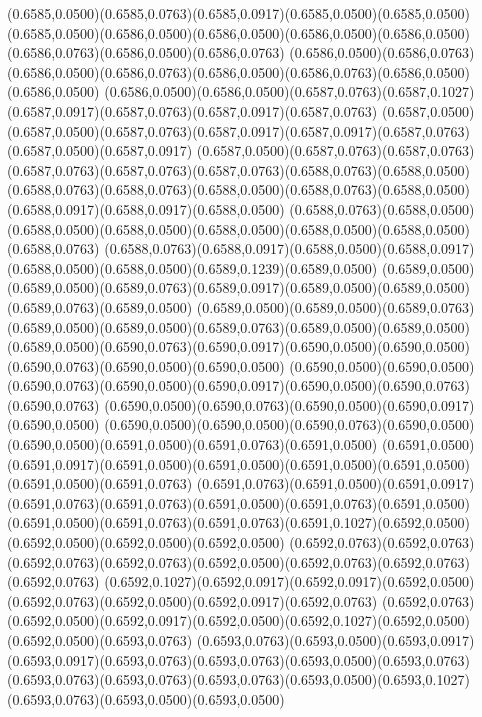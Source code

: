 (0.6585,0.0500)(0.6585,0.0763)(0.6585,0.0917)(0.6585,0.0500)(0.6585,0.0500)
\PST@Solid(0.6585,0.0500)(0.6586,0.0500)(0.6586,0.0500)(0.6586,0.0500)(0.6586,0.0500)(0.6586,0.0763)(0.6586,0.0500)(0.6586,0.0763)
(0.6586,0.0500)(0.6586,0.0763)(0.6586,0.0500)(0.6586,0.0763)(0.6586,0.0500)(0.6586,0.0763)(0.6586,0.0500)(0.6586,0.0500)
(0.6586,0.0500)(0.6586,0.0500)(0.6587,0.0763)(0.6587,0.1027)(0.6587,0.0917)(0.6587,0.0763)(0.6587,0.0917)(0.6587,0.0763)
(0.6587,0.0500)(0.6587,0.0500)(0.6587,0.0763)(0.6587,0.0917)(0.6587,0.0917)(0.6587,0.0763)(0.6587,0.0500)(0.6587,0.0917)
(0.6587,0.0500)(0.6587,0.0763)(0.6587,0.0763)(0.6587,0.0763)(0.6587,0.0763)(0.6587,0.0763)(0.6588,0.0763)(0.6588,0.0500)
(0.6588,0.0763)(0.6588,0.0763)(0.6588,0.0500)(0.6588,0.0763)(0.6588,0.0500)(0.6588,0.0917)(0.6588,0.0917)(0.6588,0.0500)
(0.6588,0.0763)(0.6588,0.0500)(0.6588,0.0500)(0.6588,0.0500)(0.6588,0.0500)(0.6588,0.0500)(0.6588,0.0500)(0.6588,0.0763)
(0.6588,0.0763)(0.6588,0.0917)(0.6588,0.0500)(0.6588,0.0917)(0.6588,0.0500)(0.6588,0.0500)(0.6589,0.1239)(0.6589,0.0500)
(0.6589,0.0500)(0.6589,0.0500)(0.6589,0.0763)(0.6589,0.0917)(0.6589,0.0500)(0.6589,0.0500)(0.6589,0.0763)(0.6589,0.0500)
(0.6589,0.0500)(0.6589,0.0500)(0.6589,0.0763)(0.6589,0.0500)(0.6589,0.0500)(0.6589,0.0763)(0.6589,0.0500)(0.6589,0.0500)
(0.6589,0.0500)(0.6590,0.0763)(0.6590,0.0917)(0.6590,0.0500)(0.6590,0.0500)(0.6590,0.0763)(0.6590,0.0500)(0.6590,0.0500)
(0.6590,0.0500)(0.6590,0.0500)(0.6590,0.0763)(0.6590,0.0500)(0.6590,0.0917)(0.6590,0.0500)(0.6590,0.0763)(0.6590,0.0763)
(0.6590,0.0500)(0.6590,0.0763)(0.6590,0.0500)(0.6590,0.0917)(0.6590,0.0500)
\PST@Solid(0.6590,0.0500)(0.6590,0.0500)(0.6590,0.0763)(0.6590,0.0500)(0.6590,0.0500)(0.6591,0.0500)(0.6591,0.0763)(0.6591,0.0500)
(0.6591,0.0500)(0.6591,0.0917)(0.6591,0.0500)(0.6591,0.0500)(0.6591,0.0500)(0.6591,0.0500)(0.6591,0.0500)(0.6591,0.0763)
(0.6591,0.0763)(0.6591,0.0500)(0.6591,0.0917)(0.6591,0.0763)(0.6591,0.0763)(0.6591,0.0500)(0.6591,0.0763)(0.6591,0.0500)
(0.6591,0.0500)(0.6591,0.0763)(0.6591,0.0763)(0.6591,0.1027)(0.6592,0.0500)(0.6592,0.0500)(0.6592,0.0500)(0.6592,0.0500)
(0.6592,0.0763)(0.6592,0.0763)(0.6592,0.0763)(0.6592,0.0763)(0.6592,0.0500)(0.6592,0.0763)(0.6592,0.0763)(0.6592,0.0763)
(0.6592,0.1027)(0.6592,0.0917)(0.6592,0.0917)(0.6592,0.0500)(0.6592,0.0763)(0.6592,0.0500)(0.6592,0.0917)(0.6592,0.0763)
(0.6592,0.0763)(0.6592,0.0500)(0.6592,0.0917)(0.6592,0.0500)(0.6592,0.1027)(0.6592,0.0500)(0.6592,0.0500)(0.6593,0.0763)
(0.6593,0.0763)(0.6593,0.0500)(0.6593,0.0917)(0.6593,0.0917)(0.6593,0.0763)(0.6593,0.0763)(0.6593,0.0500)(0.6593,0.0763)
(0.6593,0.0763)(0.6593,0.0763)(0.6593,0.0763)(0.6593,0.0500)(0.6593,0.1027)(0.6593,0.0763)(0.6593,0.0500)(0.6593,0.0500)
